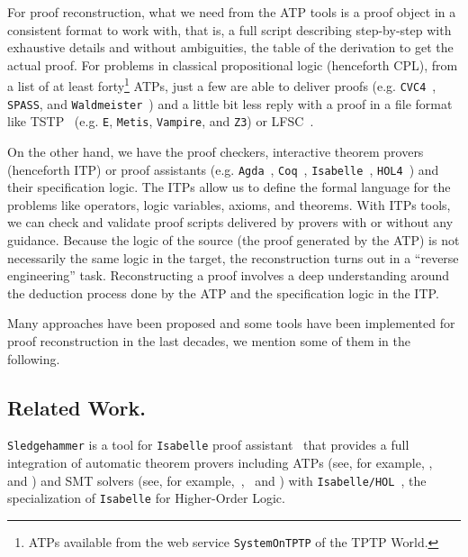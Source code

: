 \documentclass[runningheads,a4paper]{llncs}
\begin{document}
For proof reconstruction, what we need from the ATP tools is a proof object in a consistent format to work with, that is, a full script describing
step-by-step with exhaustive details and without ambiguities, the table of the
derivation to get the actual proof. For problems in classical propositional logic (henceforth CPL), from a list of
at least forty\footnote{ATPs available from the web service \texttt{SystemOnTPTP} of the TPTP World.} ATPs, just a few are able to deliver proofs (e.g.
\verb!CVC4!~\cite{Barrett2011}, \verb!SPASS!, and
\verb!Waldmeister!~\cite{hillenbrand1997}) and a little bit less reply with a proof in a file
format like TSTP~\cite{sutcliffe2004tstp} (e.g. \verb!E!, \verb!Metis!, \verb!Vampire!, and \verb!Z3!) or LFSC~\cite{Stump2008}.
 
On the other hand, we have the proof checkers, interactive theorem provers
(henceforth ITP) or proof assistants (e.g. \verb!Agda!~\cite{agdateam},
\verb!Coq!~\cite{coqteam}, \verb!Isabelle!~\cite{paulson1994isabelle},
\verb!HOL4!~\cite{norrish2007hol}) and their specification logic. The ITPs allow us to define the formal
language for the problems like operators, logic variables, axioms, and theorems.
With ITPs tools, we can check and validate proof scripts delivered by provers
with or without any guidance.
Because the logic of the source (the proof generated by the
ATP) is not necessarily the same logic in the target, the reconstruction turns
out in a ``reverse engineering'' task. Reconstructing a proof involves a deep
understanding around the deduction process done by the ATP and the specification
logic in the ITP.

Many approaches have been proposed and some tools have been implemented for proof reconstruction in the last decades, we mention some of them in the following.

\subsection*{Related Work.}\label{Related Work}
\par
\verb!Sledgehammer! is a tool for \verb!Isabelle! proof
assistant~\cite{paulson1994isabelle} that provides a full integration of
automatic theorem provers including ATPs (see, for example,
\cite{meng2006automation}, ~\cite{blanchette2013extending} and \cite{Fleury2014}) and SMT solvers (see, for
example,~\cite{blanchette2013extending},~\cite{bohme2010} and \cite{Fleury2014}) with \verb!Isabelle/HOL!~\cite{nipkow2002isabelle}, the specialization of \verb!Isabelle! for Higher-Order Logic.
\end{document}
